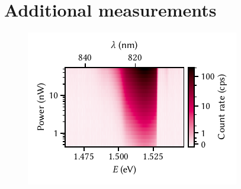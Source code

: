 \chapter{Additional measurements}\label{ch:app:exp:observations}

\begin{figure}
    \centering
    \includegraphics{img/pdf/experiment/2deg_pl_power_dependence}
    \caption[
        .
        \protect\newline
    ]{}
    \label{fig:app:exp:observations:2deg_pl_power_dependence}
\end{figure}
